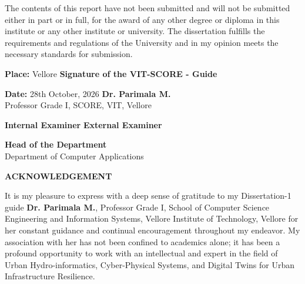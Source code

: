 \documentclass[12pt,a4paper]{report}
\begin{document}
\vspace{0.8cm}
\noindent The contents of this report have not been submitted and will not be submitted either in part or in full, for the award of any other degree or diploma in this institute or any other institute or university. The dissertation fulfills the requirements and regulations of the University and in my opinion meets the necessary standards for submission.

\vspace{2.5cm}
\noindent \textbf{Place:} Vellore \hfill \textbf{Signature of the VIT-SCORE - Guide}

\vspace{0.2cm}
\noindent \textbf{Date:} 28th October, 2026 \hfill \textbf{Dr. Parimala M.} \\
\null \hfill Professor Grade I, SCORE, VIT, Vellore

\vspace{2.5cm}
\noindent \textbf{Internal Examiner} \hfill \textbf{External Examiner}

\vspace{2.5cm}
\begin{center}
    \textbf{Head of the Department}\\
    Department of Computer Applications
\end{center}

\clearpage



\setcounter{page}{1}
\thispagestyle{plain}
\begin{center}
    {\fontsize{14pt}{18pt}\selectfont \textbf{ACKNOWLEDGEMENT}\par}
\end{center}
\vspace{0.8cm}

\noindent It is my pleasure to express with a deep sense of gratitude to my Dissertation-1 guide \textbf{Dr. Parimala M.}, Professor Grade I, School of Computer Science Engineering and Information Systems, Vellore Institute of Technology, Vellore for her constant guidance and continual encouragement throughout my endeavor. My association with her has not been confined to academics alone; it has been a profound opportunity to work with an intellectual and expert in the field of Urban Hydro-informatics, Cyber-Physical Systems, and Digital Twins for Urban Infrastructure Resilience.
\end{document}
